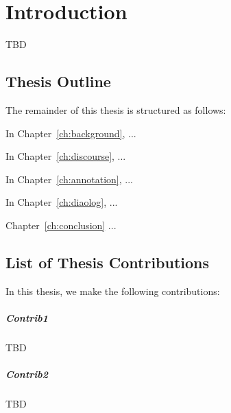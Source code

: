 \chapter{Introduction}
\label{ch:intro}

TBD



\section{Thesis Outline}

The remainder of this thesis is structured as follows:

In Chapter~\ref{ch:background}, ...

In Chapter~\ref{ch:discourse}, ...

In Chapter~\ref{ch:annotation}, ...

In Chapter~\ref{ch:diaolog}, ...

Chapter~\ref{ch:conclusion} ...


\section{List of Thesis Contributions}

\noindent In this thesis, we make the following contributions:

\paragraph{Contrib1}
TBD

\paragraph{Contrib2}
TBD